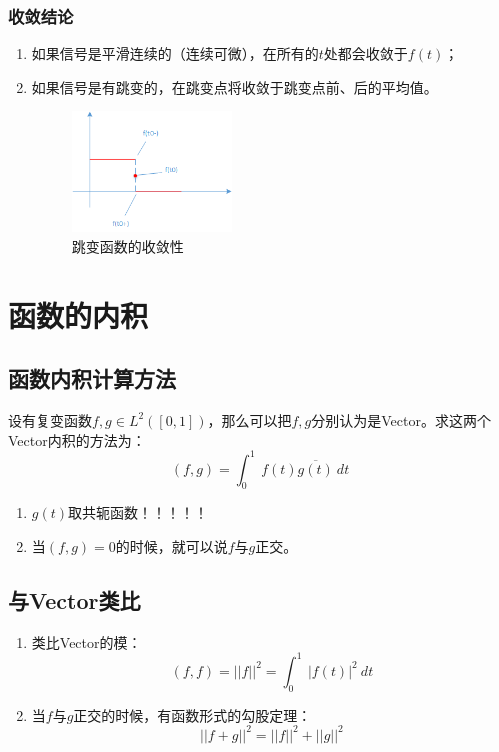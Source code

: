\subsubsection{收敛结论}
\begin{enumerate}
	\item 如果信号是平滑连续的（连续可微），在所有的$t$处都会收敛于$f(t)$；
	\item 如果信号是有跳变的，在跳变点将收敛于跳变点前、后的平均值。
	      \begin{figure}[H]
		      \centering
		      \includegraphics[width=0.4\textwidth]{assets/convergence.png}
		      \caption{跳变函数的收敛性}
	      \end{figure}
\end{enumerate}
\section{函数的内积}
\subsection{函数内积计算方法}
设有复变函数$f,g\in L^2([0,1])$，那么可以把$f,g$分别认为是Vector。求这两个Vector内积的方法为：
\begin{equation}
	(f,g)=\int_0^1\ f(t)\overline{g(t)}\ dt
\end{equation}
\begin{enumerate}
	\item $g(t)​$取共轭函数！！！！！
	\item 当$(f,g)=0$的时候，就可以说$f$与$g​$正交。
\end{enumerate}
\subsection{与Vector类比}
\begin{enumerate}
	\item 类比Vector的模：
	      $$
		      (f,f)=||f||^2=\int_0^1\ |f(t)|^2 \ dt
	      $$
	\item 当$f$与$g​$正交的时候，有函数形式的勾股定理：
	      $$
		      ||f+g||^2=||f||^2+||g||^2
	      $$
\end{enumerate}

